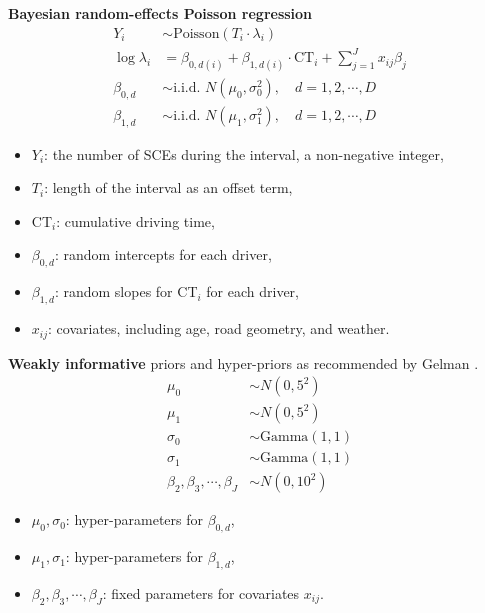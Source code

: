 \begin{frame}{\textbf{Bayesian random-effects Poisson regression}}
\begin{equation}\label{eq:pois}
\begin{split}
Y_{i}  & \sim \text{Poisson}(T_i\cdot\lambda_i)\\
\log\lambda_{i} & =\beta_{0, d(i)} + \beta_{1, d(i)} \cdot \text{CT}_i + \sum_{j=1}^{J} x_{ij}\beta_j\\
\beta_{0, d} &\sim \text{i.i.d. } N(\mu_0, \sigma_0^2), \quad d = 1, 2, \cdots, D\\
\beta_{1, d} &\sim \text{i.i.d. } N(\mu_1, \sigma_1^2), \quad d = 1, 2, \cdots, D
\end{split}
\end{equation}
\begin{itemize}
    \item $Y_i$: the number of SCEs during the interval, a non-negative integer,
    \item $T_i$: length of the interval as an offset term,
    \item CT$_i$: cumulative driving time,
    \item $\beta_{0, d}$: random intercepts for each driver,
    \item $\beta_{1, d}$: random slopes for CT$_i$ for each driver,
    \item $x_{ij}$: covariates, including age, road geometry, and weather.
\end{itemize}
\end{frame}

\begin{frame}
\textbf{Weakly informative} priors and hyper-priors as recommended by Gelman \cite{gelman2017prior}.
\begin{equation}
	\label{eq:prior}
	\begin{split}
		\mu_0 & \sim N(0, 5^2)\\
		\mu_1 & \sim N(0, 5^2)\\
		\sigma_0 & \sim \text{Gamma}(1, 1)\\
		\sigma_1 & \sim \text{Gamma}(1, 1)\\
		\beta_2, \beta_3, \cdots, \beta_J  & \sim N(0, 10^2)
	\end{split}
\end{equation}
\begin{itemize}
    \item $\mu_0, \sigma_0$: hyper-parameters for $\beta_{0, d}$,
    \item $\mu_1, \sigma_1$: hyper-parameters for $\beta_{1, d}$,
    \item $\beta_2, \beta_3, \cdots, \beta_J$: fixed parameters for covariates $x_{ij}$.
\end{itemize}
\end{frame}

